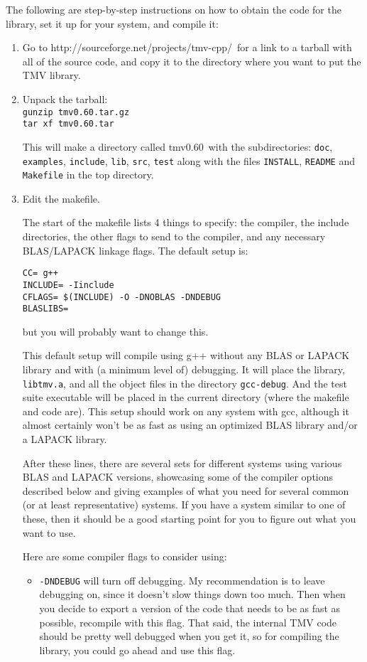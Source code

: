 \documentclass[twoside,letterpaper,11pt]{article}
\renewcommand{\tt}[1]{{\texttt {#1}}}
\newcommand{\tmvversion}{0.60}
\newcommand{\website}{http://sourceforge.net/projects/tmv-cpp/}
\begin{document}
The following are step-by-step instructions on how to obtain the code for the library,
set it up for your system, and compile it:
\begin{enumerate}

\item
Go to \website\ for a link to a tarball with all of the source code, and copy
it to the directory where you want to put the TMV library.

\item
Unpack the tarball:\\
\tt{gunzip tmv\tmvversion .tar.gz}\\
\tt{tar xf tmv\tmvversion .tar}

This will make a directory called tmv\tmvversion\ with the subdirectories:
\tt{doc}, \tt{examples}, \tt{include}, \tt{lib}, \tt{src}, \tt{test} 
along with the files \tt{INSTALL}, \tt{README} and \tt{Makefile} in the top 
directory.

\item
Edit the makefile.

The start of the makefile lists 4 things to specify: the compiler,
the include directories, the other flags to send to the compiler, 
and any necessary BLAS/LAPACK linkage flags.
The default setup is:
\begin{verbatim}
CC= g++
INCLUDE= -Iinclude
CFLAGS= $(INCLUDE) -O -DNOBLAS -DNDEBUG
BLASLIBS=
\end{verbatim}
but you will probably want to change this.

This default setup will compile using g++ without any BLAS or LAPACK library and 
with (a minimum level of) debugging.  It will place the library, \tt{libtmv.a},
and all the object files in the directory \tt{gcc-debug}.  And the test suite
executable will be placed in the current directory (where the makefile and code are).
This setup should work on any system with gcc, although it almost certainly 
won't be as fast as using an optimized BLAS library and/or a LAPACK library.

After these lines, there are several sets for different systems using various BLAS
and LAPACK versions, showcasing some of the compiler options described below
and giving examples of what you need for several common (or at least representative) systems.
If you have a system similar to one of these, then it should be a good 
starting point for you to figure out what you want to use.

Here are some compiler flags to consider using:
\begin{itemize}
\item
\tt{-DNDEBUG} will turn off debugging.  My recommendation is to leave debugging
on, since it doesn't slow things down too much.  Then when you decide to 
export a version of the code that needs to be as fast as possible, recompile
with this flag.  That said, the internal TMV code should be pretty well debugged
when you get it, so for compiling the library, you could go ahead and use this flag.


\end{itemize}
\end{enumerate}
\end{document}

